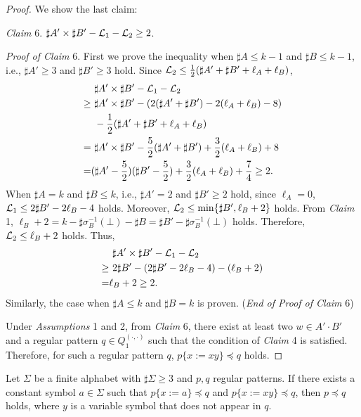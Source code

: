\begin{proof}

We show the last claim:
  
\smallskip

\noindent
\textit{Claim} 6. 
$\sharp A' \times \sharp B' - {\cal L}_{1} - {\cal L}_{2} \geq 2$.

\smallskip

\noindent
\textit{Proof of Claim} 6. 
First we prove the inequality when $\sharp A \leq k - 1$ and $\sharp B \leq k - 1$, i.e., $\sharp A' \geq 3$ and $\sharp B' \geq 3$ hold.
Since ${\cal L}_{2} \leq \frac{1}{2}(\sharp A' + \sharp B' + \ell_{A} + \ell_{B})$,
\begin{align*}
  &\ \sharp A' \times \sharp B' - {\cal L}_{1} - {\cal L}_{2}\\
\geq &\ \sharp A' \times \sharp B' - (2(\sharp A' + \sharp B') - 2(\ell_{A} + \ell_{B}) - 8)\\
  &\ - \frac{1}{2}(\sharp A' + \sharp B' + \ell_{A} + \ell_{B})\\
=    &\ \sharp A' \times \sharp B' - \frac{5}{2}(\sharp A' + \sharp B') + \frac{3}{2}(\ell_{A} + \ell_{B}) + 8\\
=    &(\sharp A' - \frac{5}{2})(\sharp B' - \frac{5}{2}) + \frac{3}{2}(\ell_{A} + \ell_{B}) + \frac{7}{4} \geq 2.
\end{align*}
When $\sharp A = k$ and $\sharp B \leq k$, i.e., $\sharp A' = 2$ and $\sharp B' \geq 2$ hold, since $\ell_{A} = 0$,
${\cal L}_{1} \leq 2\sharp B' - 2\ell_{B} -4$ holds.
Moreover, ${\cal L}_{2} \leq \min\{\sharp B', \ell_{B} + 2\}$ holds.
From \textit{Claim} 1, $\ell_B + 2 = k - \sharp\sigma^{-1}_{B}(\bot) - \sharp B = \sharp B' - \sharp\sigma^{-1}_{B}(\bot)$ holds. Therefore, ${\cal L}_{2} \leq \ell_{B} + 2$ holds.
Thus,
\begin{align*}
  &\ \sharp A' \times \sharp B' - {\cal L}_{1} - {\cal L}_{2}\\
\geq &\ 2\sharp B' - (2\sharp B' - 2\ell_{B} -4) - (\ell_{B} + 2)\\
= & \ell_B + 2 \geq 2.
\end{align*}
Similarly, the case when $\sharp A \leq k$ and $\sharp B = k$ is proven.
(\textit{End of Proof of Claim} {\color{red}6})

\smallskip

Under \textit{Assumptions} 1 and 2, from \textit{Claim} 6, there exist at least two $w\in A'\cdot B'$ and a regular pattern $q \in Q_{1}^{(\cdot,\cdot)}$ such that the condition of \textit{Claim} 4 is satisfied. 
Therefore, for such a regular pattern $q$, $p \{x := xy\} \preceq q$ holds.
\end{proof}


\begin{lem}\label{Sato1:Lemma15}%
Let $\Sigma$ be a finite alphabet with $\sharp \Sigma \ge 3$ and $p,q$ regular patterns.
If there exists a constant symbol $a \in \Sigma$ such that $p \{ x := a \} \preceq q$ and $p \{ x := xy \} \preceq q$, then $p \preceq q$ holds, where $y$ is a variable symbol that does not appear in $q$.
\end{lem}

